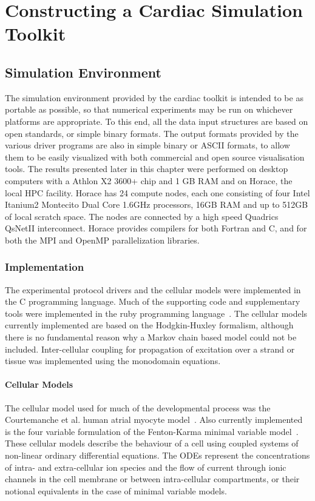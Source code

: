 \chapter{Constructing a Cardiac Simulation Toolkit}

\section{Simulation Environment}

The simulation environment provided by the cardiac toolkit is intended to be as
portable as possible, so that numerical experiments may be run on whichever
platforms are appropriate.  To this end, all the data input structures are based
on open standards, or simple binary formats.  The output formats provided by the
various driver programs are also in simple binary or ASCII formats, to allow
them to be easily visualized with both commercial and open source visualisation
tools.  The results presented later in this chapter were performed on desktop
computers with a Athlon X2 3600+ chip and 1 GB RAM and on Horace, the local HPC
facility.  Horace has 24 compute nodes, each one consisting of four Intel Itanium2
Montecito Dual Core 1.6GHz processors, 16GB RAM and up to 512GB of local scratch
space.  The nodes are connected by a high speed Quadrics QsNetII
interconnect.  Horace provides compilers for both Fortran and C,
and for both the MPI and OpenMP parallelization libraries.

\subsection{Implementation}

The experimental protocol drivers and the cellular models were implemented in
the C programming language.
Much of the supporting code and supplementary tools were implemented in the ruby
programming language~\cite{Flanagan2008}.
The cellular models currently implemented are based on the Hodgkin-Huxley
formalism, although there is no fundamental reason why a Markov chain based
model could not be included.
Inter-cellular coupling for propagation of excitation over a strand or tissue
was implemented using the monodomain equations.

\subsubsection{Cellular Models}

The cellular model used for much of the developmental process was the
Courtemanche et al. human atrial myocyte model~\cite{CRN98}.
Also currently implemented is the four variable formulation of the Fenton-Karma
minimal variable model~\cite{Bueno-Orovio2008}.
These cellular models describe the behaviour of a cell using coupled systems of
non-linear ordinary differential equations.
The ODEs represent the concentrations of intra- and extra-cellular ion species
and the flow of current through ionic channels in the cell membrane or between
intra-cellular compartments, or their notional equivalents in the case of
minimal variable models.

